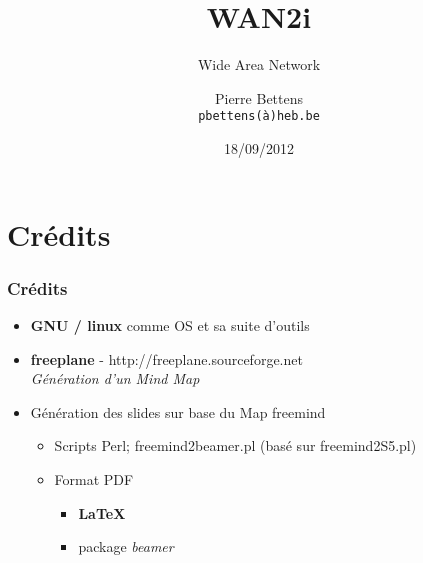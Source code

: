 \documentclass[a4paper,compress,13pt]{beamer}
\title{WAN2i}%
\subtitle{Wide Area Network}
\author[Pierre {\sc Bettens}]{Pierre {\sc Bettens} \\ \small \texttt{pbettens(\`a)heb.be}}
\institute{ÉSI - École Supérieure d'Informatique}
\date{18/09/2012}
\begin{document}
\begin{frame}[fragile]
	\titlepage
\end{frame}











\section{Crédits}

\begin{frame}[fragile]
  \frametitle{Crédits}
\begin{itemize}
	\item \textbf{GNU / linux} comme OS et sa suite d'outils
	\item \textbf{freeplane} - http://freeplane.sourceforge.net  \\ 
	\textit{Génération d'un Mind Map}
	\item Génération des slides sur base du Map freemind 
	\begin{itemize}
		\item Scripts Perl; freemind2beamer.pl (basé sur freemind2S5.pl)
		\item Format PDF
		\begin{itemize}
			\item \textbf{ \LaTeX }
			\item package \textit{beamer} 
		\end{itemize}
	\end{itemize}
\end{itemize}
\end{frame}
\end{document}
